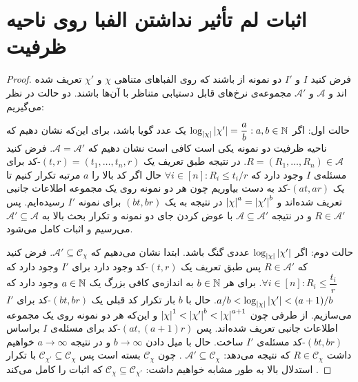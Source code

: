 \chapter{اثبات لم تأثیر نداشتن الفبا روی ناحیه ظرفیت}
\label{appendix:l1}

\begin{proof}
	فرض کنید
	$I$
	و
	$I'$
	دو نمونه از 
	\icod
	باشند که روی الفباهای متناهی
	$\chi$
	و
	$\chi'$
	تعریف شده اند و
	$\mathscr{A}$
	و
	$ \mathscr{A}'$
	مجموعه‌ی نرخ‌های قابل دستیابی متناظر با آن‌ها باشند.
	دو حالت در نظر می‌گیریم:
	
	حالت اول: اگر
	$\log_{\left|{\chi}\right|} \left|{\chi'}\right| = \dfrac{a}{b}: a, b \in \mathbb{N}$
	یک عدد گویا باشد، برای این‌که نشان دهیم که ناحیه ظرفیت دو نمونه یکی است کافی است نشان دهیم که
	$\mathscr{A} = \mathscr{A}'$.
 فرض کنید
	$R = (R_1, \ldots, R_n) \in \mathscr{A}$.
 در نتیجه طبق تعریف یک 
	$(t, r) = (t_1, \ldots, t_n, r)$-کد
	برای مسئله‌ی
	$I$
	وجود دارد که
	$\forall i \in [n]: R_i \leq t_i / r$
	حال اگر کد بالا را
	$a$
	مرتبه تکرار کنیم تا یک
	$(at, ar)$-کد
	به دست بیاوریم چون هر دو نمونه روی یک مجموعه اطلاعات جانبی تعریف شده‌اند و 
	$\left|{\chi}\right|^a = \left|{\chi'}\right|^b$
	در نتیجه به یک
	$(bt, br)$
	برای نمونه
	$I'$
	رسیده‌ایم. پس
	$R \in \mathscr{A}'$
	و در نتیجه
	$\mathscr{A} \subseteq \mathscr{A}'$
	با عوض کردن جای دو نمونه و تکرار بحث بالا به
		$\mathscr{A}' \subseteq \mathscr{A}$
		می‌رسیم و اثبات کامل می‌شود.
		
		حالت دوم: اگر
		$\log_{\left|{\chi}\right|} \left|{\chi'}\right| $
		عددی گنگ باشد. ابتدا نشان می‌دهیم که
		$\mathscr{A}' \subseteq \mathscr{C}_{\chi}$.
  فرض کنید که
		$R \in \mathscr{A}'$
		پس طبق تعریف یک
		$(t, r)$-کد
		وجود دارد برای
		$I'$
		وجود دارد که
		$\forall i \in [n]: R_i \leq \dfrac{t_i}{r}$.
  برای هر
		$b \in \mathbb{N}$
		به اندازه‌ی کافی بزرگ یک
		$a \in \mathbb{N}$
		وجود دارد که
		$a/b < \log_{\left|{\chi}\right|} \left|{\chi'}\right| < (a+1)/b$.
  حال با
		$b$
		بار تکرار کد قبلی یک 
		$(bt, br)$-کد
		برای
		$I'$
		می‌سازیم. از طرفی چون
		$\left|{\chi}\right|^1 < \left|{\chi'}\right|^b < \left|{\chi}\right|^{a + 1}$
		و این‌که هر دو نمونه روی یک مجموعه اطلاعات جانبی تعریف شده‌اند. پس
		$(at, (a+1)r)$-کد
		برای مسئله‌ی
		$I$
		براساس
		$(bt, br)$-کد
		 مسئله‌ی
		 $I'$
		 ساخت. حال با میل دادن
		 $b \rightarrow \infty$
		 و در نتیجه
		 $a \rightarrow \infty$
		 خواهیم داشت
		 $R \in \mathscr{C}_{\chi}$
		  که نتیجه می‌دهد:
		  $\mathscr{A}' \subseteq \mathscr{C}_{\chi}$
		  . چون
		  $\mathscr{C}_{\chi}$
		  بسته است پس
		  $\mathscr{C}_{\chi'} \subseteq \mathscr{C}_{\chi}$
		  با تکرار استدلال بالا به طور مشابه خواهیم داشت:
		  $\mathscr{C}_{\chi} \subseteq \mathscr{C}_{\chi'}$
		  که اثبات را کامل می‌کند \cite{fatemehbook}.
\end{proof}

